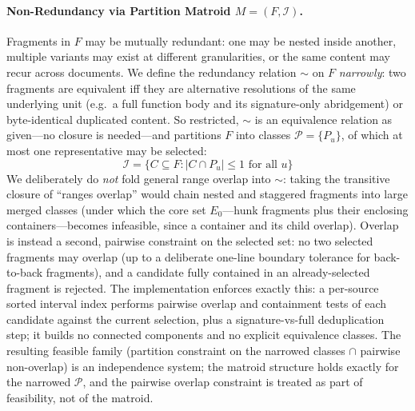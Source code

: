 \documentclass[11pt, a4paper]{article}
\begin{document}
\paragraph{Non-Redundancy via Partition Matroid $M = (F, \mathcal{I})$.} Fragments in $F$ may be mutually redundant: one may be nested inside another, multiple variants may exist at different granularities, or the same content may recur across documents. We define the redundancy relation $\sim$ on $F$ \emph{narrowly}: two fragments are equivalent iff they are alternative resolutions of the same underlying unit (e.g.\ a full function body and its signature-only abridgement) or byte-identical duplicated content. So restricted, $\sim$ is an equivalence relation as given---no closure is needed---and partitions $F$ into classes $\mathcal{P} = \{P_u\}$, of which at most one representative may be selected:
\begin{equation}
\mathcal{I} = \{C \subseteq F : |C \cap P_u| \leq 1 \text{ for all } u\}
\end{equation}
We deliberately do \emph{not} fold general range overlap into $\sim$: taking the transitive closure of ``ranges overlap'' would chain nested and staggered fragments into large merged classes (under which the core set $E_0$---hunk fragments plus their enclosing containers---becomes infeasible, since a container and its child overlap). Overlap is instead a second, pairwise constraint on the selected set: no two selected fragments may overlap (up to a deliberate one-line boundary tolerance for back-to-back fragments), and a candidate fully contained in an already-selected fragment is rejected. The implementation enforces exactly this: a per-source sorted interval index performs pairwise overlap and containment tests of each candidate against the current selection, plus a signature-vs-full deduplication step; it builds no connected components and no explicit equivalence classes. The resulting feasible family (partition constraint on the narrowed classes $\cap$ pairwise non-overlap) is an independence system; the matroid structure holds exactly for the narrowed $\mathcal{P}$, and the pairwise overlap constraint is treated as part of feasibility, not of the matroid.
\end{document}
